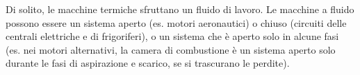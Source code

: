 \documentclass[letterpaper,10pt,english]{jupyterBook}
\begin{document}
\sphinxAtStartPar
Di solito, le macchine termiche sfruttano un fluido di lavoro. Le macchine a fluido possono essere un sistema aperto (es. motori aeronautici) o chiuso (circuiti delle centrali elettriche e di frigoriferi), o un sistema che è aperto solo in alcune fasi (es. nei motori alternativi, la camera di combustione è un sistema aperto solo durante le fasi di aspirazione e scarico, se si trascurano le perdite).

\sphinxAtStartPar
{} 

\sphinxAtStartPar
{} 

\sphinxstepscope
\end{document}
